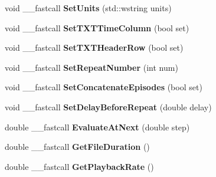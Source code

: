 \begin{DoxyCompactItemize}
\item 
\hypertarget{class_t_playback_waveform_ad16e3e03e6630c0bb9c6e7cf8546cb85}{void \+\_\+\+\_\+fastcall {\bfseries Set\+Units} (std\+::wstring units)}\label{class_t_playback_waveform_ad16e3e03e6630c0bb9c6e7cf8546cb85}

\item 
\hypertarget{class_t_playback_waveform_a8c06266cf29d6475b709d6b1561790e0}{void \+\_\+\+\_\+fastcall {\bfseries Set\+T\+X\+T\+Time\+Column} (bool set)}\label{class_t_playback_waveform_a8c06266cf29d6475b709d6b1561790e0}

\item 
\hypertarget{class_t_playback_waveform_a814796ce7c81ce34e270a78e9d3b2af0}{void \+\_\+\+\_\+fastcall {\bfseries Set\+T\+X\+T\+Header\+Row} (bool set)}\label{class_t_playback_waveform_a814796ce7c81ce34e270a78e9d3b2af0}

\item 
\hypertarget{class_t_playback_waveform_a1355cc4ffe882d3e708f14bd7689ff7b}{void \+\_\+\+\_\+fastcall {\bfseries Set\+Repeat\+Number} (int num)}\label{class_t_playback_waveform_a1355cc4ffe882d3e708f14bd7689ff7b}

\item 
\hypertarget{class_t_playback_waveform_af40738538a616b75abf1399fc10d86b0}{void \+\_\+\+\_\+fastcall {\bfseries Set\+Concatenate\+Episodes} (bool set)}\label{class_t_playback_waveform_af40738538a616b75abf1399fc10d86b0}

\item 
\hypertarget{class_t_playback_waveform_a55b1b7f1ac416198977043b0a5592199}{void \+\_\+\+\_\+fastcall {\bfseries Set\+Delay\+Before\+Repeat} (double delay)}\label{class_t_playback_waveform_a55b1b7f1ac416198977043b0a5592199}

\item 
\hypertarget{class_t_playback_waveform_a86a3d5aef61514ab4626b32705bae62f}{double \+\_\+\+\_\+fastcall {\bfseries Evaluate\+At\+Next} (double step)}\label{class_t_playback_waveform_a86a3d5aef61514ab4626b32705bae62f}

\item 
\hypertarget{class_t_playback_waveform_a825e2316f083038e26a5750ee49cfcec}{double \+\_\+\+\_\+fastcall {\bfseries Get\+File\+Duration} ()}\label{class_t_playback_waveform_a825e2316f083038e26a5750ee49cfcec}

\item 
\hypertarget{class_t_playback_waveform_a2a7ddf113350a906737d6e19d546bce1}{double \+\_\+\+\_\+fastcall {\bfseries Get\+Playback\+Rate} ()}\label{class_t_playback_waveform_a2a7ddf113350a906737d6e19d546bce1}


\end{DoxyCompactItemize}

